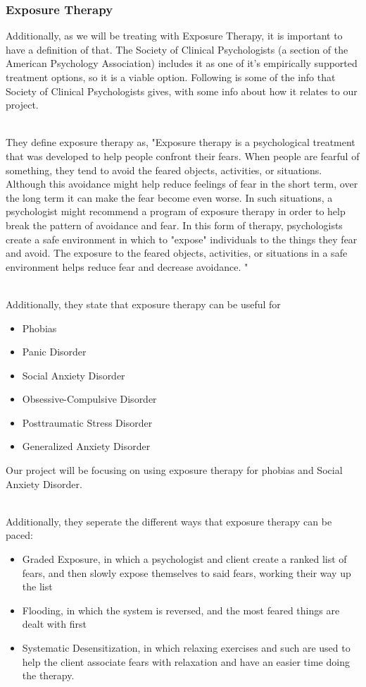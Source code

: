 \documentclass[a4paper,10pt]{article}
\begin{document}
\subsubsection{Exposure Therapy}
Additionally, as we will be treating with Exposure Therapy, it is important to have a definition of that.  The Society of Clinical Psychologists (a section of the American Psychology Association) includes it as one of it's empirically supported treatment options, so it is a viable option.  Following is some of the info that Society of Clinical Psychologists gives, with some info about how it relates to our project.
\par~\\ 
They define exposure therapy as, "Exposure therapy is a psychological treatment that was developed to help people confront their fears. When people
are fearful of something, they tend to avoid the feared objects, activities, or situations. Although this avoidance might help reduce feelings of fear in the short term, over the long term it can make the fear become even worse. In such situations, a psychologist might recommend a program of exposure therapy in order to help break the pattern of avoidance and fear. In this form of therapy, psychologists create a safe environment in which to "expose" individuals to the things they fear and avoid. The exposure to the feared objects, activities, or situations in a safe environment helps reduce fear and decrease avoidance. "
\par~\\ 
Additionally, they state that exposure therapy can be useful for 
\begin{itemize}
	\item Phobias
	\item Panic Disorder
	\item Social Anxiety Disorder
	\item Obsessive-Compulsive Disorder
	\item Posttraumatic Stress Disorder
	\item Generalized Anxiety Disorder 
\end{itemize}
Our project will be focusing on using exposure therapy for phobias and Social Anxiety Disorder.  
\par~\\ 
Additionally, they seperate the different ways that exposure therapy can be paced:
\begin{itemize}
	\item Graded Exposure, in which a psychologist and client create a ranked list of fears, and then slowly expose themselves to said fears, working their way up the list
	\item Flooding, in which the system is reversed, and the most feared things are dealt with first
	\item Systematic Desensitization, in which relaxing exercises and such are used to help the client associate fears with relaxation and have an easier time doing the therapy.
\end{itemize}
\end{document}
